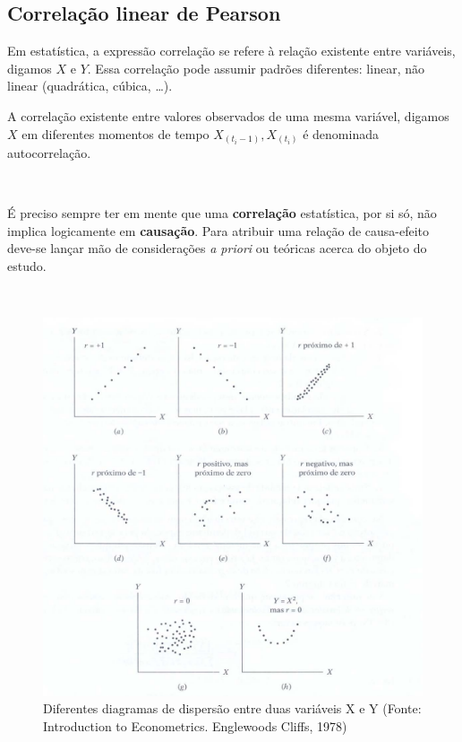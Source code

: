 \documentclass[
]{book}
\begin{document}
\hypertarget{correlauxe7uxe3o-linear-de-pearson}{%
\subsection{Correlação linear de Pearson}\label{correlauxe7uxe3o-linear-de-pearson}}

\hfill\break

Em estatística, a expressão correlação se refere à relação existente entre variáveis, digamos \(X\) e \(Y\). Essa correlação pode assumir padrões diferentes: linear, não linear (quadrática, cúbica, \dots).

\hfill\break

A correlação existente entre valores observados de uma mesma variável, digamos \(X\) em diferentes momentos de tempo \(X_{(t_i-1)}, X_{(t_i)}\) é denominada autocorrelação.

~

É preciso sempre ter em mente que uma \textbf{correlação} estatística, por si só, não implica logicamente em \textbf{causação}. Para atribuir uma relação de causa-efeito deve-se lançar mão de considerações \emph{a priori} ou teóricas acerca do objeto do estudo.

~

\begin{figure}

{\centering \includegraphics[width=1\linewidth]{images8/graficos_correlacoes} 

}

\caption{Diferentes diagramas de dispersão entre duas variáveis X e Y (Fonte: Introduction to Econometrics. Englewoods Cliffs, 1978)}\label{fig:fig44}
\end{figure}
\end{document}
